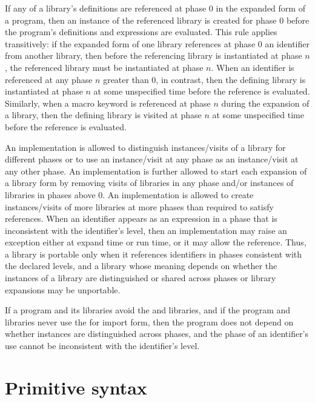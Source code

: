 If any of a library's definitions are referenced at phase $0$ in the
expanded form of a program, then an instance of the referenced library
is created for phase $0$ before the program's definitions and
expressions are evaluated. This rule applies transitively: if the
expanded form of one library references at phase $0$ an identifier
from another library, then before the referencing library is
instantiated at phase $n$, the referenced library must be instantiated
at phase $n$. When an identifier is referenced at any phase $n$
greater than $0$, in contrast, then the defining library is
instantiated at phase $n$ at some unspecified time before the
reference is evaluated. Similarly, when a macro keyword is referenced at
phase $n$ during the expansion of a library, then the
defining library is visited at phase $n$ at some unspecified time
before the reference is evaluated.

An implementation is allowed to distinguish instances/visits of a library for
different phases or to use an instance/visit at any phase as an instance/visit at
any other phase. An implementation is further allowed to start each
expansion of a {\cf library} form by removing
visits of libraries in any phase and/or instances of
libraries in phases above $0$. An implementation is allowed to
create instances/visits of more libraries at more phases than required to
satisfy references. When an identifier appears as an expression in a
phase that is inconsistent with the identifier's level, then an
implementation may raise an exception either at expand time or run
time, or it may allow the reference. Thus, a library is portable only
when it references identifiers in phases consistent with the declared
levels, and a library whose meaning depends on whether the
instances of a library are distinguished or shared across phases or
{\cf library} expansions may be unportable.

\begin{note}
If a program and its libraries avoid the \thersixlibrary{}
and  libraries, and if the program and libraries
never use the {\cf for} import form, then the program does not depend
on whether instances are distinguished across phases, and the phase of
an identifier's use cannot be inconsistent with the identifier's level.
\end{note} 

\section{Primitive syntax}

